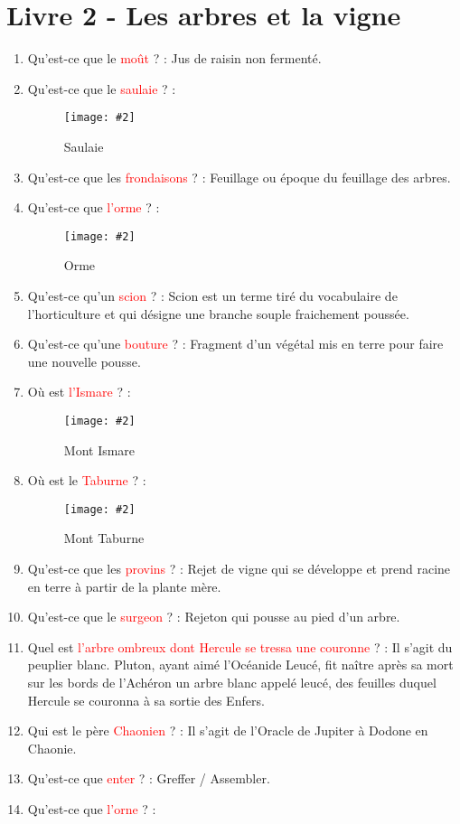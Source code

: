 \documentclass[a4paper, 11pt, hidelinks]{article}
\newcommand{\img}[4]{\begin{figure}[!ht]
    \centering
    \texttt{[image: \#2]}
    \caption{#3}
    \label{#4}
    \end{figure} }
\begin{document}
\section{Livre 2 - Les arbres et la vigne}


\begin{enumerate}
      \item Qu'est-ce que le \textcolor{red}{moût} ? : Jus de raisin non fermenté.
      \item Qu'est-ce que le \textcolor{red}{saulaie} ? :
            \img{0.5}{saulaie.jpg}{Saulaie}{53}
            \item Qu'est-ce que les \textcolor{red}{frondaisons} ? : Feuillage ou époque du feuillage des arbres.
            \item Qu'est-ce que \textcolor{red}{l'orme} ? :
            \img{0.5}{orme.jpg}{Orme}{55}
            \item Qu'est-ce qu'un \textcolor{red}{scion} ? : Scion est un terme tiré du vocabulaire de l’horticulture et
            qui désigne une branche souple fraichement poussée.
            \item Qu'est-ce qu'une \textcolor{red}{bouture} ?  : Fragment d'un végétal mis en terre pour faire une nouvelle pousse.
            \item Où est \textcolor{red}{l'Ismare} ? :
            \img{0.3}{Ismare.png}{Mont Ismare}{56}
      \item Où est le \textcolor{red}{Taburne} ? :
            \img{0.3}{Taburne.png}{Mont Taburne}{57}
            \item Qu'est-ce que les \textcolor{red}{provins} ? : Rejet de vigne qui se développe et prend racine en terre à partir de la plante mère.
            \item Qu'est-ce que le \textcolor{red}{surgeon} ? : Rejeton qui pousse au pied d'un arbre.
            \item Quel est \textcolor{red}{l'arbre ombreux dont Hercule se tressa une couronne} ? : Il s'agit du peuplier blanc. Pluton, ayant aimé l'Océanide
            Leucé, fit naître après sa mort sur les bords de l'Achéron un arbre blanc appelé leucé, des feuilles duquel Hercule se couronna
            à sa sortie des Enfers.
      \item Qui est le père \textcolor{red}{Chaonien} ? : Il s'agit de l'Oracle de Jupiter à Dodone en Chaonie.
      \item Qu'est-ce que \textcolor{red}{enter} ? : Greffer / Assembler.
      \item Qu'est-ce que \textcolor{red}{l'orne} ? :

\end{enumerate}
\end{document}
